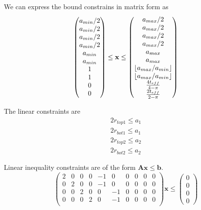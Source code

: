 \documentclass[12pt]{article}
\numberwithin{equation}{section}
\DeclarePairedDelimiter\floor{\lfloor}{\rfloor}
\numberwithin{equation}{section}
\begin{document}
\begin{outline}[enumerate]
We can express the bound constrains in matrix form as
\begin{equation}
\left(
\begin{matrix}
a_{min}/2\\ 
a_{min}/2\\ 
a_{min}/2\\ 
a_{min}/2\\
a_{min}\\ 
a_{min}\\ 
1 \\    %
1 \\
0 \\
0 \\
\end{matrix} \right )
\leq \mathbf{x}
 \leq 
 \left(
\begin{matrix}
a_{max}/2 \\ a_{max}/2 \\ a_{max}/2 \\ a_{max}/2 \\ a_{max} \\ a_{max} \\ \floor{a_{max}/a_{min}}  \\ \floor{a_{max}/a_{min}}  \\  \frac {4t_{eff}}{4- \pi}\\  \frac {2t_{eff}}{2- \pi}
\end{matrix} \right )
\end{equation}

The linear constraints are 
\begin{align*} 
2 r_{top1} \leq a_1 \\
2 r_{bot1} \leq a_1\\
2 r_{top2} \leq a_2\\
2 r_{bot2} \leq a_2 
\end{align*}

Linear inequality constraints are of the form $\mathbf{A} \mathbf{x} \leq \mathbf{b}$.
\setcounter{MaxMatrixCols}{20}
\begin{equation}
\left(
\begin{matrix}
2 & 0 & 0 & 0 & -1 & 0 & 0 & 0 & 0 & 0 \\
0 & 2 & 0 & 0 & -1 & 0 & 0 & 0 & 0 & 0 \\
0 & 0 & 2 & 0 & 0 & -1 & 0 & 0 & 0 & 0 \\
0 & 0 & 0 & 2 & 0 & -1 & 0 & 0 & 0 & 0  \\
\end{matrix}
\right ) \mathbf{x}  \leq \left ( \begin{matrix} 0\\ 0\\ 0\\ 0  \end{matrix} \right ) 
\end{equation}


\end{outline}
\end{document}
